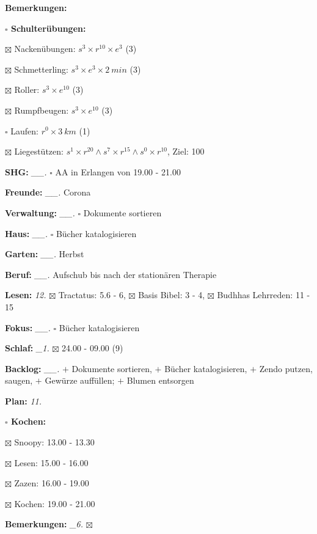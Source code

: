 \documentclass[10pt,a4paper]{article}
\newcommand\prop[1] {{\color {alizarin} {\bf #1}}}        %
\newcommand\mand[1] {{\color {burntorange} {\bf #1}}}     %
\newcommand\topspace{\vskip -15pt \hskip 20pt}
\newcommand\bottomspace{\vskip 4pt}
\newcommand\n[1] { {\sl #1.} \hskip 5pt }
\begin{document}
\begin{mdframed}[style=daystyle]
\begin{labeling}{{\mand {Bemerkungen:}}}
\begin{minipage}{0.75\textwidth}
\begin{labeling}{\prop {$\square$ {Schulterübungen:}}}
      \item[$\boxtimes$ Nackenübungen:]   $s^3 \times r^{10} \times e^3$ (3)
      \item[$\boxtimes$ Schmetterling:]   $s^3 \times e^3 \times 2\ min$ (3)
      \item[$\boxtimes$ Roller:]          $s^3 \times e^{10}$ (3)
      \item[$\boxtimes$ Rumpfbeugen:]     $s^3 \times e^{10}$ (3)
      \item[$\square$ Laufen:]          $r^0 \times 3\ km$ (1)
      \item[$\boxtimes$ Liegestützen:]    $s^1 \times r^{20} \land s^7 \times r^{15} \land s^0 \times r^{10}$, Ziel: 100
      \end{labeling}
    \end{minipage}
    \bottomspace        
  \item[{\mand {SHG:}}]          \n{\_\_} $\square$ AA in Erlangen von 19.00 - 21.00
  \item[{\mand {Freunde:}}]      \n{\_\_} Corona
  \item[{\mand {Verwaltung:}}]   \n{\_\_} $\square$ Dokumente sortieren
  \item[{\mand {Haus:}}]         \n{\_\_} $\square$ Bücher katalogisieren
  \item[{\mand {Garten:}}]       \n{\_\_} Herbst
  \item[{\mand {Beruf:}}]        \n{\_\_} Aufschub bis nach der stationären Therapie
  \item[{\mand {Lesen:}}]          \n{12} $\boxtimes$ Tractatus: 5.6 - 6, $\boxtimes$ Basis Bibel: 3 - 4,
      $\boxtimes$ Budhhas Lehrreden: 11 - 15
  \item[{\mand {Fokus:}}]        \n{\_\_} $\square$ Bücher katalogisieren
  \item[{\mand {Schlaf:}}]        \n{\_1} $\boxtimes$ 24.00 - 09.00 (9)
  \item[{\mand {Backlog:}}]      \n{\_\_}
    $+$ Dokumente sortieren, $+$ Bücher katalogisieren,
    $+$ Zendo putzen, saugen, $+$ Gewürze auffüllen; $+$ Blumen entsorgen
  \item[{\mand {Plan:}}]           \n{11}
    \topspace
    \begin{minipage}{0.75\textwidth}  
      \begin{labeling}{\prop {$\square$ {Kochen:}}} 
        \setlength\itemsep{-3pt}
      \item[$\boxtimes$ Snoopy:] 13.00 - 13.30
      \item[$\boxtimes$ Lesen:]  15.00 - 16.00        
      \item[$\boxtimes$ Zazen:]  16.00 - 19.00
      \item[$\boxtimes$ Kochen:] 19.00 - 21.00
      \end{labeling}
    \end{minipage}
    \bottomspace
  \item[{\mand {Bemerkungen:}}]  \n{\_6} $\boxtimes$
  \end{labeling}
    

\end{mdframed}
\end{document}
